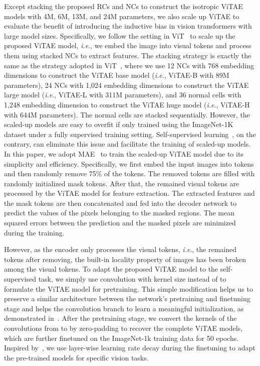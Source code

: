 \documentclass[twocolumn]{svjour3}          \smartqed  \usepackage{natbib}
\newcommand{\ie}{i.e}
\def\onedot{.\xspace}
\def\ie{\emph{i.e}\onedot}
\begin{document}
Except stacking the proposed RCs and NCs to construct the isotropic ViTAE models with 4M, 6M, 13M, and 24M parameters, we also scale up ViTAE to evaluate the benefit of introducing the inductive bias in vision transformers with large model sizes. Specifically, we follow the setting in ViT~\citep{dosovitskiy2020image} to scale up the proposed ViTAE model, \ie, we embed the image into visual tokens and process them using stacked NCs to extract features. The stacking strategy is exactly the same as the strategy adopted in ViT~\citep{dosovitskiy2020image}, where we use 12 NCs with 768 embedding dimensions to construct the ViTAE base model (\ie, ViTAE-B with 89M parameters), 24 NCs with 1,024 embedding dimensions to construct the ViTAE large model (\ie, ViTAE-L with 311M parameters), and 36 normal cells with 1,248 embedding dimension to construct the ViTAE huge model (\ie, ViTAE-H with 644M parameters). The normal cells are stacked sequentially. However, the scaled-up models are easy to overfit if only trained using the ImageNet-1K dataset under a fully supervised training setting. Self-supervised learning~\citep{he2021masked}, on the contrary, can eliminate this issue and facilitate the training of scaled-up models. In this paper, we adopt MAE~\citep{he2021masked} to train the scaled-up ViTAE model due to its simplicity and efficiency. Specifically, we first embed the input images into tokens and then randomly remove 75\% of the tokens. The removed tokens are filled with randomly initialized mask tokens. After that, the remained visual tokens are processed by the ViTAE model for feature extraction. The extracted features and the mask tokens are then concatenated and fed into the decoder network to predict the values of the pixels belonging to the masked regions. The mean squared errors between the prediction and the masked pixels are minimized during the training. 

However, as the encoder only processes the visual tokens, \ie, the remained tokens after removing, the built-in locality property of images has been broken among the visual tokens. To adapt the proposed ViTAE model to the self-supervised task, we simply use convolution with kernel size  instead of  to formulate the ViTAE model for pretraining. This simple modification helps us to preserve a similar architecture between the network's pretraining and finetuning stage and helps the convolution branch to learn a meaningful initialization, as demonstrated in~\citep{zhang2018fully}. After the pretraining stage, we convert the kernels of the convolutions from  to  by zero-padding to recover the complete ViTAE models, which are further finetuned on the ImageNet-1k training data for 50 epochs. Inspired by~\citep{beit}, we use layer-wise learning rate decay during the finetuning to adapt the pre-trained models for specific vision tasks.  
\end{document}
